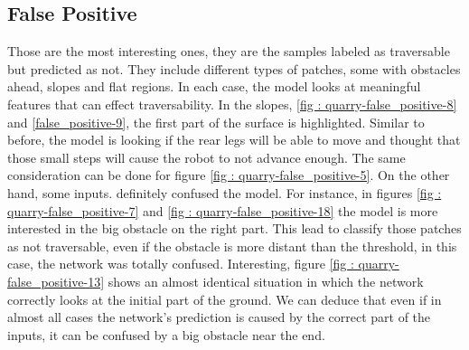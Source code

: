 \subsection{False Positive}
Those are the most interesting ones, they are the samples labeled as traversable but predicted as not. They include different types of patches, some with obstacles ahead, slopes and flat regions. In each case, the model looks at meaningful features that can effect traversability. In the slopes, \ref{fig : quarry-false_positive-8} and \ref{false_positive-9}, the first part of the surface is highlighted. Similar to before, the model is looking if the rear legs will be able to move and thought that those small steps will cause the robot to not advance enough. The same consideration can be done for figure \ref{fig : quarry-false_positive-5}. On the other hand, some inputs. definitely confused the model. For instance, in figures \ref{fig : quarry-false_positive-7} and \ref{fig : quarry-false_positive-18} the model is more interested in the big obstacle on the right part. This lead to classify those patches as not traversable, even if the obstacle is more distant than the threshold, in this case, the network was totally confused. Interesting, figure \ref{fig : quarry-false_positive-13} shows an almost identical situation in which the network correctly looks at the initial part of the ground. We can deduce that even if in almost all cases the network's prediction is caused by the correct part of the inputs, it can be confused by a big obstacle near the end.
